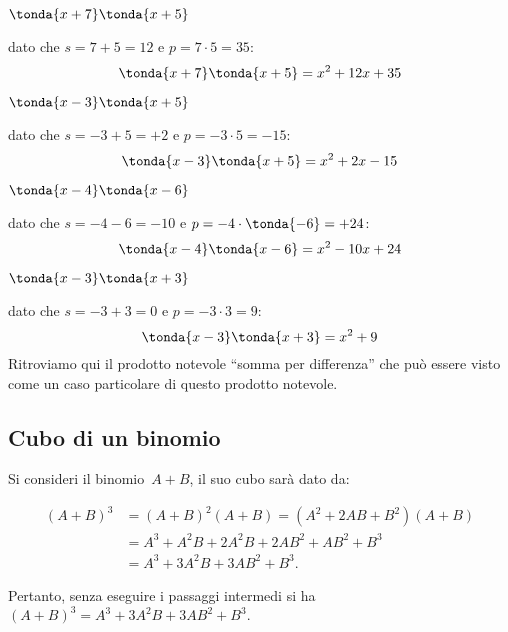 \begin{exrig}
 \begin{esempio}
\(\tonda{x+7} \tonda{x+5}\)

dato che \(s=7+5=12\) e \(p=7 \cdot 5=35\):
\[\tonda{x+7} \tonda{x+5}=x^2+12x+35\]
 \end{esempio}

 \begin{esempio}
\(\tonda{x-3} \tonda{x+5}\)

dato che \(s=-3+5=+2\) e \(p=-3 \cdot 5=-15\):
\[\tonda{x-3} \tonda{x+5}=x^2+2x-15\]
 \end{esempio}

 \begin{esempio}
\(\tonda{x-4} \tonda{x-6}\)

dato che \(s=-4-6=-10\) e \(p=-4 \cdot \tonda{-6}=+24\):
\[\tonda{x-4} \tonda{x-6}=x^2-10x+24\]
 \end{esempio}

 \begin{esempio}
\(\tonda{x-3} \tonda{x+3}\)

dato che \(s=-3+3=0\) e \(p=-3 \cdot 3=9\):
\[\tonda{x-3} \tonda{x+3}=x^2+9\]
Ritroviamo qui il prodotto notevole ``somma per differenza'' che può essere 
visto come un caso particolare di questo prodotto notevole.
 \end{esempio}

\end{exrig}




\subsection{Cubo di un binomio}
\label{subsec:11_prodnot_cubo}

Si consideri il binomio~$A+B$, il suo cubo sarà dato da:

\begin{align*}
\left(A+B\right)^{3}&=\left(A+B\right)^{2}\left(A+B\right)=\left(A^{2}+2{AB}
+B^{2}\right)\left(A+B\right)\\
&=A^{3}+A^{2}B+2A^{2}B+2{AB}^{2}+{AB}^{2}+B^{3}\\
&=A^{3}+3A^{2}B+3{AB}^{2}+B^{3}.
\end{align*}

Pertanto, senza eseguire i passaggi intermedi si ha
$\left(A+B\right)^{3}=A^{3}+3A^{2}B+3{AB}^{2}+B^{3}$.

